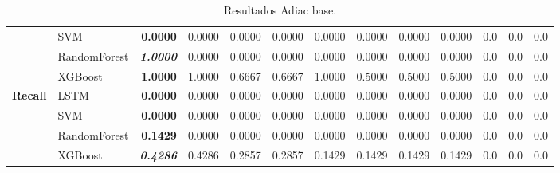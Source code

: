 \begin{table}[H]
\begin{adjustbox}{max width=14cm}
\begin{tabular}{|c|l|r|r|r|r|r|r|r|r|r|r|r|}
			&  SVM & \textbf{  0.0000 } &  0.0000 &  0.0000 &  0.0000 &  0.0000 &  0.0000 &  0.0000 &  0.0000 &  0.0 &  0.0 &  0.0 \\
			&  RandomForest & \textit{ \textbf{  1.0000 } } &  0.0000 &  0.0000 &  0.0000 &  0.0000 &  0.0000 &  0.0000 &  0.0000 &  0.0 &  0.0 &  0.0 \\
			&  XGBoost & \textbf{  1.0000 } &  1.0000 &  0.6667 &  0.6667 &  1.0000 &  0.5000 &  0.5000 &  0.5000 &  0.0 &  0.0 &  0.0 \\
			\hline
			\textbf{Recall} &  LSTM & \textbf{  0.0000 } &  0.0000 &  0.0000 &  0.0000 &  0.0000 &  0.0000 &  0.0000 &  0.0000 &  0.0 &  0.0 &  0.0 \\
			&  SVM & \textbf{  0.0000 } &  0.0000 &  0.0000 &  0.0000 &  0.0000 &  0.0000 &  0.0000 &  0.0000 &  0.0 &  0.0 &  0.0 \\
			&  RandomForest & \textbf{  0.1429 } &  0.0000 &  0.0000 &  0.0000 &  0.0000 &  0.0000 &  0.0000 &  0.0000 &  0.0 &  0.0 &  0.0 \\
			&  XGBoost & \textit{ \textbf{  0.4286 } } &  0.4286 &  0.2857 &  0.2857 &  0.1429 &  0.1429 &  0.1429 &  0.1429 &  0.0 &  0.0 &  0.0 \\
			\hline
		\end{tabular}
	\end{adjustbox}
	\caption{Resultados Adiac base.}
	\label{tab:Adiac_base}
\end{table}

